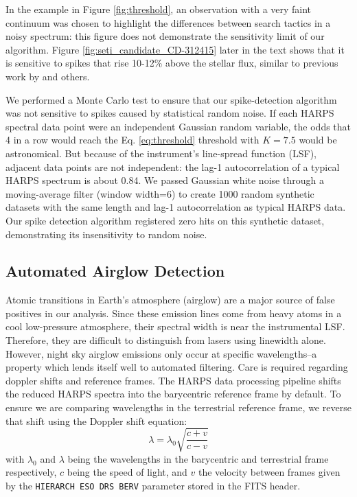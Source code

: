 \documentclass[twocolumn]{aastex701}
\begin{document}
In the example in Figure \ref{fig:threshold}, an observation with a very faint continuum was chosen to highlight the differences between search tactics in a noisy spectrum: this figure does not demonstrate the sensitivity limit of our algorithm.  Figure \ref{fig:seti_candidate_CD-312415} later in the text shows that it is sensitive to spikes that rise 10-12\% above the stellar flux, similar to previous work by \cite{Tellis_2017} and others.

We performed a Monte Carlo test to ensure that our spike-detection algorithm was not sensitive to spikes caused by statistical random noise.  If each HARPS spectral data point were an independent Gaussian random variable, the odds that 4 in a row would reach the Eq. \ref{eq:threshold} threshold with $K=7.5$ would be astronomical.  But because of the instrument's line-spread function (LSF), adjacent data points are not independent: the lag-1 autocorrelation of a typical HARPS spectrum is about 0.84.  We passed Gaussian white noise through a moving-average filter (window width=6) to create 1000 random synthetic datasets with the same length and lag-1 autocorrelation as typical HARPS data.  Our spike detection algorithm registered zero hits on this synthetic dataset, demonstrating its insensitivity to random noise.

\subsection{Automated Airglow Detection}
\label{s:Airglow}
Atomic transitions in Earth's atmosphere (airglow) are a major source of false positives in our analysis.  Since these emission lines come from heavy atoms in a cool low-pressure atmosphere, their spectral width is near the instrumental LSF. Therefore, they are difficult to distinguish from lasers using linewidth alone. However, night sky airglow emissions only occur at specific wavelengths--a property which lends itself well to automated filtering.  Care is required regarding doppler shifts and reference frames. The HARPS data processing pipeline shifts the reduced HARPS spectra into the barycentric reference frame by default.  To ensure we are comparing wavelengths in the terrestrial reference frame, we reverse that shift using the Doppler shift equation:
\begin{equation}
    \lambda = \lambda_0 \sqrt{\frac{c + v}{c - v}}
    \label{eq:doppler}
\end{equation}
with $\lambda_0$ and $\lambda$ being the wavelengths in the barycentric and terrestrial frame respectively, $c$ being the speed of light, and $v$ the velocity between frames given by the \texttt{HIERARCH ESO DRS BERV} parameter stored in the FITS header.  
\end{document}
